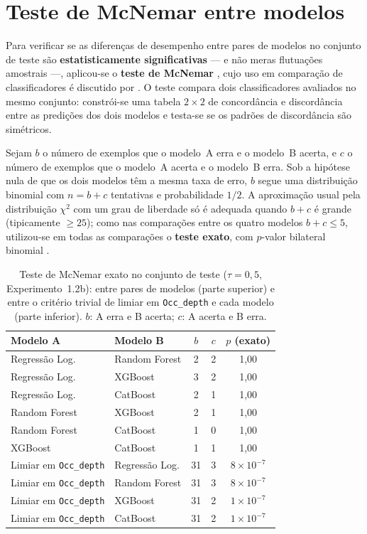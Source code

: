 \section{Teste de McNemar entre modelos}
\label{sec:mcnemar}

Para verificar se as diferenças de desempenho entre pares de modelos no conjunto de teste são \textbf{estatisticamente significativas} --- e não meras flutuações amostrais ---, aplicou-se o \textbf{teste de McNemar} \citep{McNemarOrig1947}, cujo uso em comparação de classificadores é discutido por \citet{McNemar1947}. O teste compara dois classificadores avaliados no mesmo conjunto: constrói-se uma tabela $2 \times 2$ de concordância e discordância entre as predições dos dois modelos e testa-se se os padrões de discordância são simétricos.

Sejam $b$ o número de exemplos que o modelo~A erra e o modelo~B acerta, e $c$ o número de exemplos que o modelo~A acerta e o modelo~B erra. Sob a hipótese nula de que os dois modelos têm a mesma taxa de erro, $b$ segue uma distribuição binomial com $n = b + c$ tentativas e probabilidade $1/2$. A aproximação usual pela distribuição $\chi^2$ com um grau de liberdade só é adequada quando $b + c$ é grande (tipicamente $\geq 25$); como nas comparações entre os quatro modelos $b + c \leq 5$, utilizou-se em todas as comparações o \textbf{teste exato}, com $p$-valor bilateral binomial \citep{McNemar1947}.

\begin{table}[htbp]
\centering
\small
\caption{Teste de McNemar exato no conjunto de teste ($\tau = 0{,}5$, Experimento~1.2b): entre pares de modelos (parte superior) e entre o critério trivial de limiar em \texttt{Occ\_depth} e cada modelo (parte inferior). $b$: A erra e B acerta; $c$: A acerta e B erra.}
\label{tab:mcnemar}
\begin{tabular}{@{}llccc@{}}
\hline
\textbf{Modelo A} & \textbf{Modelo B} & $b$ & $c$ & $p$ (exato) \\
\hline
Regressão Log. & Random Forest & 2 & 2 & 1{,}00 \\
Regressão Log. & XGBoost & 3 & 2 & 1{,}00 \\
Regressão Log. & CatBoost & 2 & 1 & 1{,}00 \\
Random Forest & XGBoost & 2 & 1 & 1{,}00 \\
Random Forest & CatBoost & 1 & 0 & 1{,}00 \\
XGBoost & CatBoost & 1 & 1 & 1{,}00 \\
\hline
Limiar em \texttt{Occ\_depth} & Regressão Log. & 31 & 3 & $8 \times 10^{-7}$ \\
Limiar em \texttt{Occ\_depth} & Random Forest & 31 & 3 & $8 \times 10^{-7}$ \\
Limiar em \texttt{Occ\_depth} & XGBoost & 31 & 2 & $1 \times 10^{-7}$ \\
Limiar em \texttt{Occ\_depth} & CatBoost & 31 & 2 & $1 \times 10^{-7}$ \\
\hline
\end{tabular}
\end{table}

